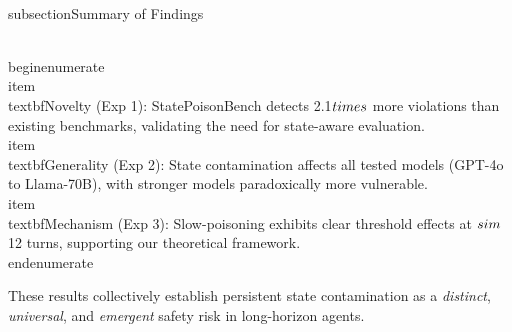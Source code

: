 \\subsection{Summary of Findings}

\\begin{enumerate}
    \\item \\textbf{Novelty (Exp 1):} StatePoisonBench detects 2.1$\\times$ more violations than existing benchmarks, validating the need for state-aware evaluation.
    \\item \\textbf{Generality (Exp 2):} State contamination affects all tested models (GPT-4o to Llama-70B), with stronger models paradoxically more vulnerable.
    \\item \\textbf{Mechanism (Exp 3):} Slow-poisoning exhibits clear threshold effects at $\\sim$12 turns, supporting our theoretical framework.
\\end{enumerate}

These results collectively establish persistent state contamination as a \textit{distinct}, \textit{universal}, and \textit{emergent} safety risk in long-horizon agents.

